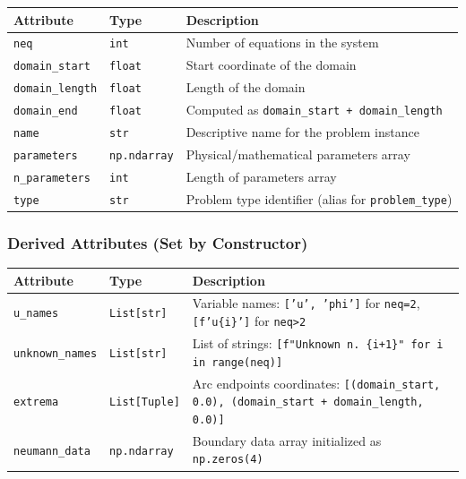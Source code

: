 \begin{longtable}{|p{3.5cm}|p{2.5cm}|p{7cm}|}
\hline
\textbf{Attribute} & \textbf{Type} & \textbf{Description} \\
\hline
\endhead

\texttt{neq} & \texttt{int} & Number of equations in the system \\
\hline

\texttt{domain\_start} & \texttt{float} & Start coordinate of the domain \\
\hline

\texttt{domain\_length} & \texttt{float} & Length of the domain  \\
\hline

\texttt{domain\_end} & \texttt{float} & Computed as \texttt{domain\_start + domain\_length} \\
\hline

\texttt{name} & \texttt{str} & Descriptive name for the problem instance \\
\hline

\texttt{parameters} & \texttt{np.ndarray} & Physical/mathematical parameters array \\
\hline

\texttt{n\_parameters} & \texttt{int} & Length of parameters array \\
\hline

\texttt{type} & \texttt{str} & Problem type identifier (alias for \texttt{problem\_type}) \\
\hline

\end{longtable}

\subsubsection{Derived Attributes (Set by Constructor)}

\begin{longtable}{|p{3.5cm}|p{2.5cm}|p{7cm}|}
\hline
\textbf{Attribute} & \textbf{Type} & \textbf{Description} \\
\hline
\endhead

\texttt{u\_names} & \texttt{List[str]} & Variable names: \texttt{['u', 'phi']} for \texttt{neq=2}, \texttt{[f'u\{i\}']} for \texttt{neq>2} \\
\hline

\texttt{unknown\_names} & \texttt{List[str]} & List of strings: \texttt{[f"Unknown n. \{i+1\}" for i in range(neq)]} \\
\hline

\texttt{extrema} & \texttt{List[Tuple]} & Arc endpoints coordinates: \texttt{[(domain\_start, 0.0), (domain\_start + domain\_length, 0.0)]} \\
\hline

\texttt{neumann\_data} & \texttt{np.ndarray} & Boundary data array initialized as {\color{red} \texttt{np.zeros(4)} }\\
\hline

\end{longtable}


